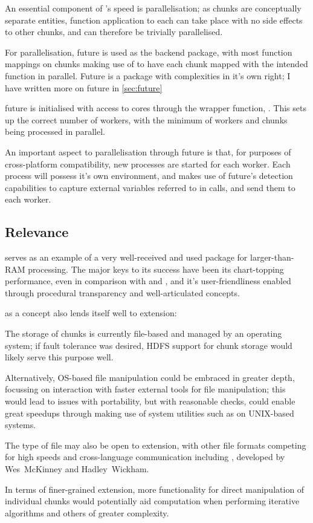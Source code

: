 An essential component of 's speed is parallelisation; as
chunks are conceptually separate entities, function application to each
can take place with no side effects to other chunks, and can therefore
be trivially parallelised.

For parallelisation, future is used as the backend package, with most
function mappings on chunks making use of 
to have each chunk mapped with the intended function in parallel. Future
is a package with complexities in it's own right; I have written more on
future in \cref{sec:future}

future is initialised with access to cores through the wrapper function,
\cite{zj19:_key}.
This sets up the correct number of workers, with the minimum of workers
and chunks being processed in parallel.

An important aspect to parallelisation through future is that, for
purposes of cross-platform compatibility, new \R{} processes are started
for each worker\cite{zj19:_using}. Each process will possess it's own
environment, and  makes use of future's detection capabilities
to capture external variables referred to in calls, and send them to
each worker.

\subsection{Relevance}\label{sec:relevance}

 serves as an example of a very well-received and used package
for larger-than-RAM processing. The major keys to its success have been
its chart-topping performance, even in comparison with  and ,
and it's user-friendliness enabled through procedural transparency and
well-articulated concepts.

 as a concept also lends itself well to extension:

The storage of chunks is currently file-based and managed by an
operating system; if fault tolerance was desired, HDFS support for chunk
storage would likely serve this purpose well.

Alternatively, OS-based file manipulation could be embraced in greater
depth, focussing on interaction with faster external tools for file
manipulation; this would lead to issues with portability, but with
reasonable checks, could enable great speedups through making use of
system utilities such as  on UNIX-based systems.

The type of file may also be open to extension, with other file formats
competing for high speeds and cross-language communication including , developed by Wes~McKinney and Hadley~Wickham\cite{wes16}.

In terms of finer-grained extension, more functionality for direct
manipulation of individual chunks would potentially aid computation when
performing iterative algorithms and others of greater complexity.
